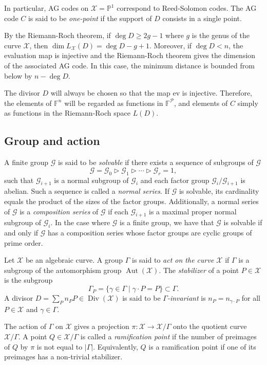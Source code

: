 \documentclass[10pt,a4paper]{article}
\newcommand\F{\mathbb{F}}
\newcommand\PP{\mathbb{P}}
\DeclareMathOperator{\Aut}{Aut}
\DeclareMathOperator{\Div}{Div}
\newcommand{\size}[1]{\left|#1\right|}
\newcommand\calX{\mathcal{X}}
\newcommand\calP{\mathcal{P}}
\newcommand\calG{\mathcal{G}}
\theoremstyle{plain}
\theoremstyle{plain}
\theoremstyle{definition}
\theoremstyle{remark}
\theoremstyle{plain}
\begin{document}
In particular, AG codes on $\calX = \PP^1$ correspond to Reed-Solomon codes. 
The AG code $C$ is said to be \emph{one-point} if the support of $D$ consists in a single point.

By the {Riemann-Roch} theorem, if $\deg D \geq 2g-1$ where $g$ is the genus of the curve $\calX$, then $\dim L_\calX(D)=\deg D -g +1$. Moreover, if $\deg D< n$, the evaluation map is injective and the {Riemann-Roch} theorem gives the dimension of the associated AG code. In this case, the minimum distance is bounded from below by $n - \deg D$.

The divisor $D$ will always be chosen so that the map $\text{ev}$ is injective. Therefore, the elements of $\F^n$ will be regarded as functions in $\F^\calP$, and elements of $C$ simply as functions in the {Riemann-Roch} space $L(D)$.

\subsection{Group and action}
A finite group $\calG$  is said to be \emph{solvable} if  there exists a sequence of subgroups of $\calG$ 
\[\calG=\calG_0 \vartriangleright \calG_1 \vartriangleright \cdots \vartriangleright \calG_r = 1, \] 
such that $\calG_{i+1}$ is a normal subgroup of $\calG_i$ and each factor group $\calG_i / \calG_{i+1}$ is abelian. Such a sequence is called a \emph{normal series}. If $\calG$ is solvable, its cardinality equals the product of the sizes of the factor groups. 
Additionally, a normal series of $\calG$ is a \emph{composition series} of $\calG$ if each $\calG_{i+1}$ is a maximal proper normal subgroup of $\calG_{i}$. In the case where $\calG$ is a finite group, we have that $\calG$ is solvable if and only if $\calG$ has a composition series whose factor groups are cyclic groups of prime order.

Let $\calX$ be an algebraic curve. A group $\Gamma$ is said to \emph{act on the curve $\calX$} if $\Gamma$ is a subgroup of the automorphism group $\Aut(\calX)$. The \emph{stabilizer} of a point $P \in \calX$ is the subgroup \[\Gamma_P=\{\gamma \in \Gamma \mid \gamma\cdot P = P\} \subset \Gamma.\] 
A divisor $D=\sum_P n_P P \in \Div(\calX)$ is said to be \emph{$\Gamma$-invariant} is $n_P=n_{\gamma\cdot P}$ for all $P\in \calX$ and $\gamma \in \Gamma$.

The action of $\Gamma$ on $\calX$ gives a projection $\pi: \calX \rightarrow \calX/\Gamma$ onto the quotient curve $\calX/\Gamma$. A point $Q \in \calX/\Gamma$ is called a \emph{ramification point} if the number of preimages of $Q$ by $\pi$ is not equal to $\size{\Gamma}$. Equivalently, $Q$ is a ramification point if one of its preimages has a non-trivial stabilizer. 
\end{document}
